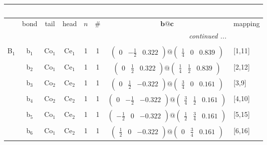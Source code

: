 \documentclass[fleqn,10pt,landscape]{article}
\begin{document}
\begin{itemize}
\begin{center}
\begin{longtable}{cc|cc|c|c|c|l}
\multicolumn{7}{l}{\tablename\ \thetable{}} \\
 \hline \hline
 & bond & tail & head & $n$ & \# & $\bm{b}@\bm{c}$ & mapping \\ \hline \endhead

 \hline \hline
\multicolumn{7}{r}{\footnotesize\it continued ...} \\ \endfoot

 \hline \hline
\multicolumn{7}{r}{} \\ \endlastfoot

B$_{1}$ & b$_{1}$ & Co$_{1}$ & Ce$_{1}$ & 1 & 1 & $\begin{pmatrix} 0 & - \frac{1}{2} & 0.322 \end{pmatrix}@\begin{pmatrix} \frac{1}{4} & 0 & 0.839 \end{pmatrix}$ & [1,11] \\
& b$_{2}$ & Co$_{1}$ & Ce$_{1}$ & 1 & 1 & $\begin{pmatrix} 0 & \frac{1}{2} & 0.322 \end{pmatrix}@\begin{pmatrix} \frac{1}{4} & \frac{1}{2} & 0.839 \end{pmatrix}$ & [2,12] \\
& b$_{3}$ & Co$_{2}$ & Ce$_{2}$ & 1 & 1 & $\begin{pmatrix} 0 & \frac{1}{2} & -0.322 \end{pmatrix}@\begin{pmatrix} \frac{3}{4} & 0 & 0.161 \end{pmatrix}$ & [3,9] \\
& b$_{4}$ & Co$_{2}$ & Ce$_{2}$ & 1 & 1 & $\begin{pmatrix} 0 & - \frac{1}{2} & -0.322 \end{pmatrix}@\begin{pmatrix} \frac{3}{4} & \frac{1}{2} & 0.161 \end{pmatrix}$ & [4,10] \\
& b$_{5}$ & Co$_{1}$ & Ce$_{2}$ & 1 & 1 & $\begin{pmatrix} - \frac{1}{2} & 0 & -0.322 \end{pmatrix}@\begin{pmatrix} \frac{1}{2} & \frac{3}{4} & 0.161 \end{pmatrix}$ & [5,15] \\
& b$_{6}$ & Co$_{1}$ & Ce$_{2}$ & 1 & 1 & $\begin{pmatrix} \frac{1}{2} & 0 & -0.322 \end{pmatrix}@\begin{pmatrix} 0 & \frac{3}{4} & 0.161 \end{pmatrix}$ & [6,16] \\

\end{longtable}
\end{center}
\end{itemize}
\end{document}
